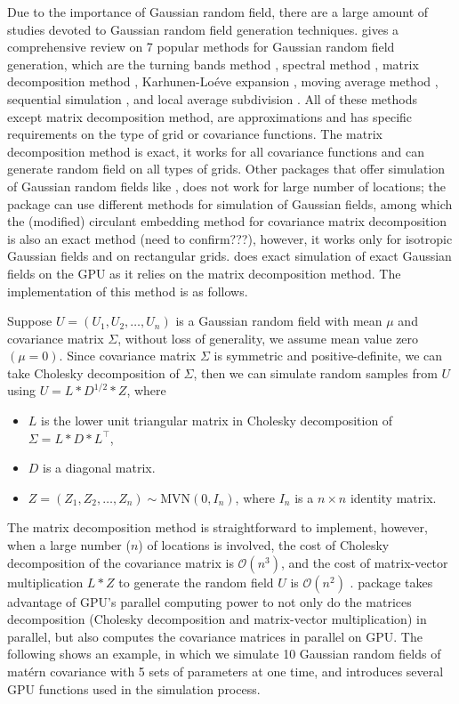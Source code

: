 \documentclass[article,nojss]{jss}\usepackage[]{graphicx}\usepackage[]{color}
\begin{document}
Due to the importance of Gaussian random field, there are a large amount of studies devoted to Gaussian random field generation techniques. \cite{LiuandLi2019} gives a comprehensive review on 7 popular methods for Gaussian random field generation, which are the turning bands method \citep{matheron_1973}, spectral method \citep{Meja1974OnTS,1972JSV}, matrix decomposition method \citep{davis1987}, Karhunen-Lo\'eve expansion \citep{LoeveM:1978}, moving average method \citep{journel1974, oliver1995moving}, sequential simulation \citep{johnson1987multivariate, gomez1993joint, pebesma2004multivariable}, and local average subdivision \citep{fenton1990simulation}. All of these methods except matrix decomposition method, are approximations and has specific requirements on the type of grid or covariance functions. The matrix decomposition method is exact, it works for all covariance functions and can generate random field on all types of grids. Other  packages that offer simulation of Gaussian random fields like  \citep{geoR2001}, does not work for large number of locations; the  \citep{RandomFields2015,RandomFields2020} package can use different methods for simulation of Gaussian fields, among which the (modified) circulant embedding method \citep{Dietrich1997FastAE} for covariance matrix decomposition is also an exact method (need to confirm???), however, it works only for isotropic Gaussian fields and on rectangular grids.  does exact simulation of exact Gaussian fields on the GPU as it relies on the matrix decomposition method. The implementation of this method is as follows.


Suppose $U=(U_1, U_2, \dots, U_n)$ is a Gaussian random field with mean $\mu$ and covariance matrix $\Sigma$, without loss of generality, we assume mean value zero $(\mu = 0)$. Since covariance matrix $\Sigma$ is symmetric and positive-definite, we can take Cholesky decomposition of $\Sigma$, then we can simulate random samples from $U$ using $U=L*D^{1/2}*Z$, where 
\begin{itemize}
\item $L$ is the lower unit triangular matrix in Cholesky decomposition of $\Sigma = L*D*L^\top$,
\item $D$ is a diagonal matrix.
\item $Z=(Z_1, Z_2, \dots, Z_n) \sim \text{MVN}(0,I_n)$, where $I_n$ is a $n \times n$ identity matrix.
\end{itemize}
The matrix decomposition method is straightforward to implement, however, when a large number ($n$) of locations is involved, the cost of Cholesky decomposition of the covariance matrix is $\mathcal{O}(n^3)$,  and the cost of matrix-vector multiplication $L*Z$ to generate the random field $U$ is $\mathcal{O}(n^2)$ \citep{LiuandLi2019}.   package takes advantage of GPU's parallel computing power to not only do the matrices decomposition (Cholesky decomposition and matrix-vector multiplication) in parallel, but also computes the covariance matrices in parallel on GPU. The following shows an example, in which we simulate 10 Gaussian random fields of mat\'ern covariance with 5 sets of parameters at one time, and introduces several GPU functions used in the simulation process.
\end{document}

